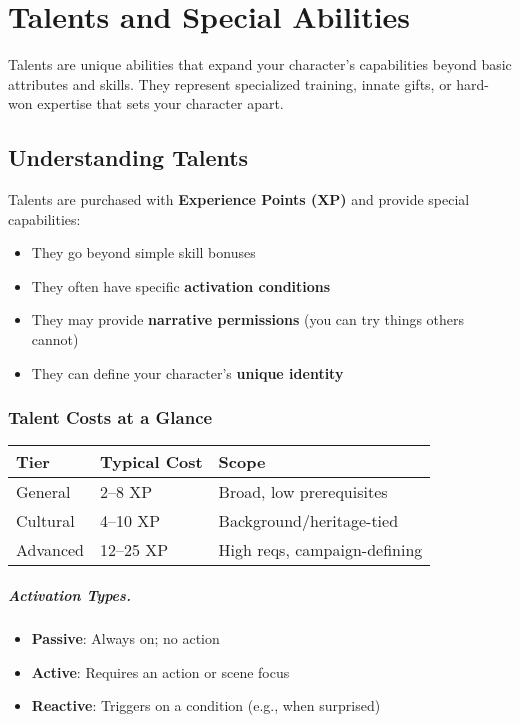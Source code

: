 \chapter{Talents and Special Abilities}
\label{ch:talents}

Talents are unique abilities that expand your character's capabilities beyond basic attributes and skills. They represent specialized training, innate gifts, or hard-won expertise that sets your character apart.

\section{Understanding Talents}

Talents are purchased with \textbf{Experience Points (XP)} and provide special capabilities:
\begin{itemize}
\item They go beyond simple skill bonuses
\item They often have specific \textbf{activation conditions}
\item They may provide \textbf{narrative permissions} (you can try things others cannot)
\item They can define your character's \textbf{unique identity}
\end{itemize}

\subsection*{Talent Costs at a Glance}
\begin{center}
\small
\begin{tabular}{lll}
\toprule
\textbf{Tier} & \textbf{Typical Cost} & \textbf{Scope} \\
\midrule
General & 2--8 XP & Broad, low prerequisites \\
Cultural & 4--10 XP & Background/heritage-tied \\
Advanced & 12--25 XP & High reqs, campaign-defining \\
\bottomrule
\end{tabular}
\end{center}

\paragraph{Activation Types.}
\begin{itemize}
\item \textbf{Passive}: Always on; no action
\item \textbf{Active}: Requires an action or scene focus
\item \textbf{Reactive}: Triggers on a condition (e.g., when surprised)
\end{itemize}

